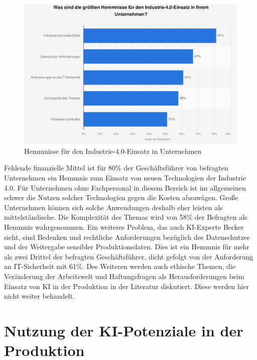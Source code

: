 \documentclass[a4paper,12pt, german]{report}
\begin{document}
\begin{figure}[H]
  \center
 \includegraphics[width=12cm]{images/hemnisse.png}
  \caption[Hemmnisse für den Industrie-4.0-Einsatz in Unternehmen]{Hemmnisse für den Industrie-4.0-Einsatz in Unternehmen \cite{35}}
\end{figure}

Fehlende finanzielle Mittel ist für 80\% der Geschäftsführer von befragten Unternehmen ein Hemmnis zum Einsatz von neuen Technologien der Industrie 4.0.\cite{35} Für Unternehmen ohne Fachpersonal in diesem Bereich ist im allgemeinen schwer die Nutzen solcher Technologien gegen die Kosten abzuwägen. Große Unternehmen können sich solche Anwendungen deshalb eher leisten als mittelständische. Die Komplexität des Themas wird von 58\% der Befragten als Hemmnis wahrgenommen.\cite{35} Ein weiteres Problem, das auch KI-Experte Becker sieht, sind Bedenken und rechtliche Anforderungen bezüglich des Datenschutzes und der Weitergabe sensibler Produktionsdaten.\cite{41} Dies ist ein Hemmnis für mehr als zwei Drittel der befragten Geschäftsführer, dicht gefolgt von der Anforderung an IT-Sicherheit mit 61\%.\cite{35}\newline 
Des Weiteren werden auch ethische Themen, die Veränderung der Arbeitswelt und Haftungsfragen als Herausforderungen beim Einsatz von KI in der Produktion in der Literatur diskutiert. Diese werden hier nicht weiter behandelt.


\section{Nutzung der KI-Potenziale in der Produktion}
\end{document}
